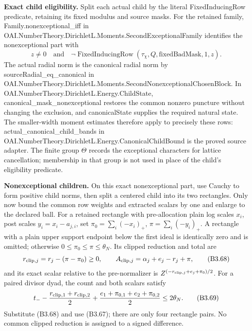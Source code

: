 \documentclass[11pt,a4paper]{article}
\newcommand{\sourcecode}[1]{{\small\ttfamily #1}}
\begin{document}
\textbf{Exact child eligibility.} Split each actual child by the literal
\sourcecode{Fixed\allowbreak{}Inducing\allowbreak{}Row} predicate, retaining its fixed modulus and
source masks. For the retained family,
\sourcecode{Family.\allowbreak{}nonexceptional\_\allowbreak{}iff} in
\sourcecode{OAI.\allowbreak{}Number\allowbreak{}Theory.\allowbreak{}Dirichlet\allowbreak{}L.\allowbreak{}Moments.\allowbreak{}Second\allowbreak{}Exceptional\allowbreak{}Family}
identifies the nonexceptional part with \[
z\ne0\quad\text{and}\quad
\neg\operatorname{FixedInducingRow}(\tau_\chi,Q,\mathrm{fixedBadMask},1,z).
\] The actual radial norm is the canonical radial norm by
\sourcecode{source\allowbreak{}Radial\_\allowbreak{}eq\_\allowbreak{}canonical} in
\sourcecode{OAI.\allowbreak{}Number\allowbreak{}Theory.\allowbreak{}Dirichlet\allowbreak{}L.\allowbreak{}Moments.\allowbreak{}Second\allowbreak{}Nonexceptional\allowbreak{}Chosen\allowbreak{}Block}.
In \sourcecode{OAI.\allowbreak{}Number\allowbreak{}Theory.\allowbreak{}Dirichlet\allowbreak{}L.\allowbreak{}Energy.\allowbreak{}Child\allowbreak{}State},
\sourcecode{canonical\_\allowbreak{}mask\_\allowbreak{}nonexceptional} restores the common nonzero
puncture without changing the exclusion, and \sourcecode{canonical\allowbreak{}State}
supplies the required natural state. The smaller-width moment estimates
therefore apply to precisely these rows:
\sourcecode{actual\_\allowbreak{}canonical\_\allowbreak{}child\_\allowbreak{}bands} in
\sourcecode{OAI.\allowbreak{}Number\allowbreak{}Theory.\allowbreak{}Dirichlet\allowbreak{}L.\allowbreak{}Energy.\allowbreak{}Canonical\allowbreak{}Child\allowbreak{}Bound} is the
proved source adapter. The finite group \(\Theta\) records the
exceptional characters for lattice cancellation; membership in that
group is not used in place of the child's eligibility predicate.

\textbf{Nonexceptional children.} On this exact nonexceptional part, use
Cauchy to form positive child norms, then split a centered child into
its two rectangles. Only now bound the common row weights and extracted
scalars by one and enlarge to the declared ball. For a retained
rectangle with pre-allocation plain log scales \(x_i\), post scales
\(y_i=x_i-a_{j,\allowbreak{}i}\), set \(\pi_0=\sum_i(-x_i)_+\),
\(\pi=\sum_i(-y_i)_+\). A rectangle with a plain upper support endpoint
below the first ideal is identically zero and is omitted; otherwise
\(0\le\pi_0\le\pi\le\theta_N\). Its clipped reduction and total are \[
r_{{\rm clip},j}=r_j-(\pi-\pi_0)\ge0,\qquad
A_{{\rm clip},j}=\alpha_j+e_j-r_j+\pi,
\tag{B3.68}
\] and its exact scalar relative to the pre-normalizer is
\(Z^{(-r_{{\rm clip},\allowbreak{}j}+e_j+\pi_0)/2}\). For a paired divisor dyad, the
count and both scalars satisfy \[
t_--\frac{r_{{\rm clip},1}+r_{{\rm clip},2}}2
 +\frac{e_1+\pi_{0,1}+e_2+\pi_{0,2}}2\le2\theta_N.
\tag{B3.69}
\] Substitute (B3.68) and use (B3.67); there are only four rectangle
pairs. No common clipped reduction is assigned to a signed difference.
\end{document}
